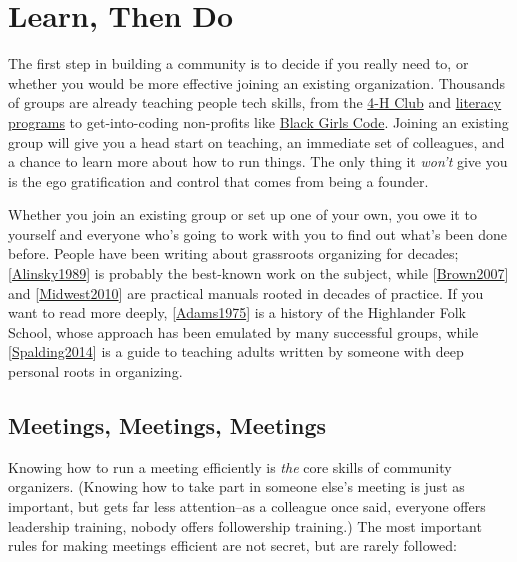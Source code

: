 \documentclass[10pt,statementpaper]{memoir}
\begin{document}
\section{Learn, Then Do}\label{learn-then-do}

The first step in building a community is to decide if you really need
to, or whether you would be more effective joining an existing
organization. Thousands of groups are already teaching people tech
skills, from the \href{http://www.4-h-canada.ca/}{4-H Club} and
\href{https://www.frontiercollege.ca/}{literacy programs} to
get-into-coding non-profits like
\href{http://www.blackgirlscode.com/}{Black Girls Code}. Joining an
existing group will give you a head start on teaching, an immediate set
of colleagues, and a chance to learn more about how to run things. The
only thing it \emph{won't} give you is the ego gratification and control
that comes from being a founder.

Whether you join an existing group or set up one of your own, you owe it
to yourself and everyone who's going to work with you to find out what's
been done before. People have been writing about grassroots organizing
for decades; {[}\href{biblio.html\#alinsky-rules}{Alinsky1989}{]} is
probably the best-known work on the subject, while
{[}\href{biblio.html\#brown-bpco}{Brown2007}{]} and
{[}\href{biblio.html\#midwest-organizing}{Midwest2010}{]} are practical
manuals rooted in decades of practice. If you want to read more deeply,
{[}\href{biblio.html\#adams-seeds}{Adams1975}{]} is a history of the
Highlander Folk School, whose approach has been emulated by many
successful groups, while
{[}\href{biblio.html\#spalding-adults}{Spalding2014}{]} is a guide to
teaching adults written by someone with deep personal roots in
organizing.

\subsection*{Meetings, Meetings,
Meetings}\label{meetings-meetings-meetings}

Knowing how to run a meeting efficiently is \emph{the} core skills of
community organizers. (Knowing how to take part in someone else's
meeting is just as important, but gets far less attention--as a
colleague once said, everyone offers leadership training, nobody offers
followership training.) The most important rules for making meetings
efficient are not secret, but are rarely followed:
\end{document}
